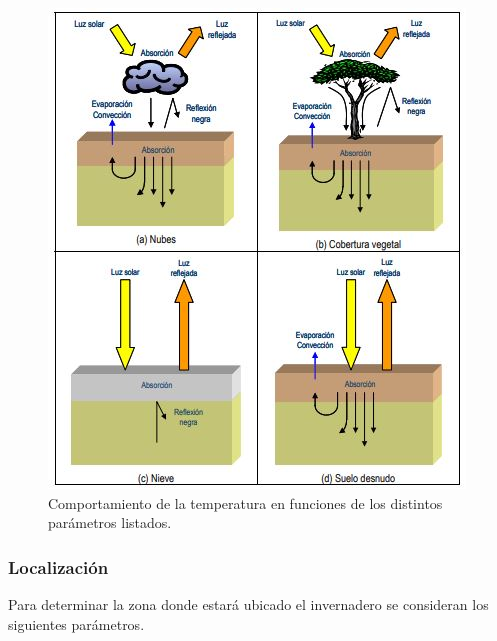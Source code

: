 \begin{figure}[H]
    \centering
    \includegraphics[width=\textwidth, keepaspectratio,
    heigh=7cm]{images/temperaturasuelo.JPG}
    \caption{Comportamiento de la temperatura en funciones de los distintos
    parámetros listados. }
    \label{fig:temperaturasuelo}
\end{figure}

\subsubsection{Localización}

Para determinar la zona donde estará ubicado el invernadero se
consideran los siguientes parámetros.

